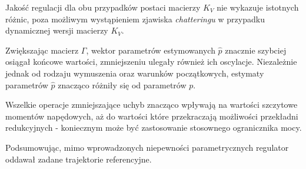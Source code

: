 \documentclass[12pt, a4paper, polish]{article}
\begin{document}
Jakość regulacji dla obu przypadków postaci macierzy $K_V$ nie wykazuje istotnych różnic, poza możliwym wystąpieniem zjawiska \textit{chatteringu} w przypadku dynamicznej wersji macierzy $K_V$.

Zwiększając macierz $\Gamma$, wektor parametrów estymowanych $\hat{p}$ znacznie szybciej osiągał końcowe wartości, zmniejszeniu ulegały również ich oscylacje. Niezależnie jednak od rodzaju wymuszenia oraz warunków początkowych, estymaty parametrów $\hat{p}$ znacząco różniły się od parametrów $p$.

Wszelkie operacje zmniejszające uchyb znacząco wpływają na wartości szczytowe momentów napędowych, aż do wartości które przekraczają możliwości przekładni redukcyjnych - koniecznym może być zastosowanie stosownego ogranicznika mocy. 

Podsumowując, mimo wprowadzonych niepewności parametrycznych regulator oddawał zadane trajektorie referencyjne.
\end{document}
